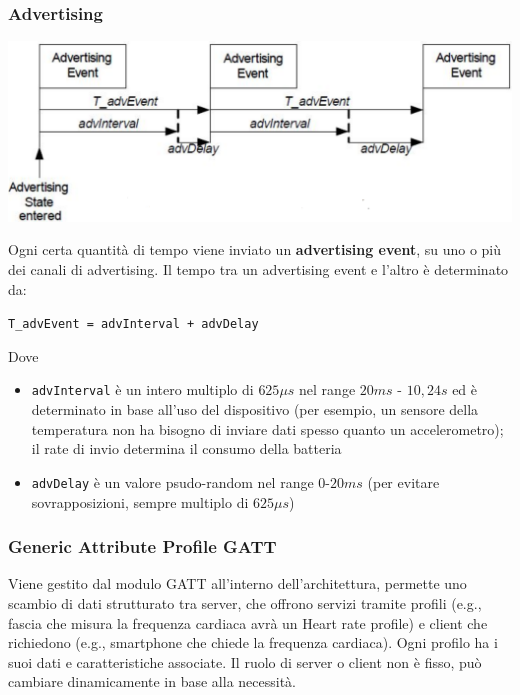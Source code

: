 \subsubsection{Advertising}
\begin{center}
	\includegraphics[width=0.85\linewidth]{img/wpan/bleadvert}
\end{center}

Ogni certa quantità di tempo viene inviato un \textbf{advertising event}, su uno o più dei canali di advertising. Il tempo tra un advertising event e l'altro è determinato da:
\begin{center}
	\texttt{T\_advEvent = advInterval + advDelay}
\end{center}
Dove
\begin{itemize}
	\item \texttt{advInterval} è un intero multiplo di $625 \mu s$ nel range $20 ms$ - $10,24s$ ed è determinato in base all'uso del dispositivo (per esempio, un sensore della temperatura non ha bisogno di inviare dati spesso quanto un accelerometro); il rate di invio determina il consumo della batteria
	\item \texttt{advDelay} è un valore psudo-random nel range $0$-$20ms$ (per evitare sovrapposizioni, sempre multiplo di $625 \mu s$)
\end{itemize}

\subsubsection{Generic Attribute Profile GATT}
Viene gestito dal modulo GATT all'interno dell'architettura, permette uno scambio di dati strutturato tra server, che offrono servizi tramite profili (e.g., fascia che misura la frequenza cardiaca avrà un Heart rate profile) e client che richiedono (e.g., smartphone che chiede la frequenza cardiaca). Ogni profilo ha i suoi dati e caratteristiche associate. Il ruolo di server o client non è fisso, può cambiare dinamicamente in base alla necessità.

